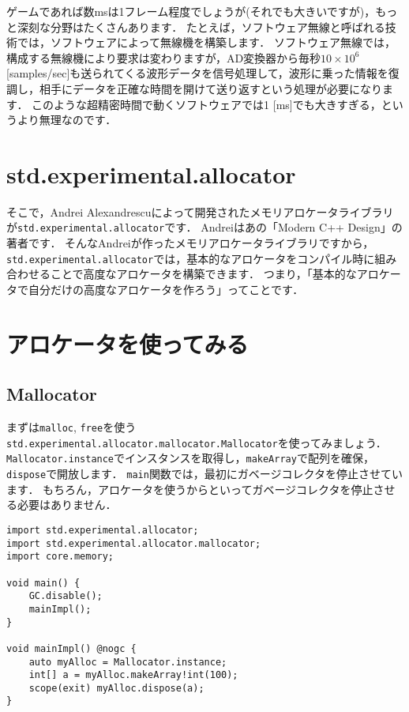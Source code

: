 ゲームであれば数msは1フレーム程度でしょうが(それでも大きいですが)，もっと深刻な分野はたくさんあります．
たとえば，ソフトウェア無線と呼ばれる技術では，ソフトウェアによって無線機を構築します．
ソフトウェア無線では，構成する無線機により要求は変わりますが，AD変換器から毎秒$10 \times 10^6$ [samples/sec]も送られてくる波形データを信号処理して，波形に乗った情報を復調し，相手にデータを正確な時間を開けて送り返すという処理が必要になります．
このような超精密時間で動くソフトウェアでは1
{[}ms{]}でも大きすぎる，というより無理なのです．

\section{std.experimental.allocator}

そこで，Andrei Alexandrescuによって開発されたメモリアロケータライブラリが\texttt{std.experimental.allocator}です．
Andreiはあの「Modern C++ Design」の著者です．
そんなAndreiが作ったメモリアロケータライブラリですから，
\texttt{std.experimental.allocator}では，基本的なアロケータをコンパイル時に組み合わせることで高度なアロケータを構築できます．
つまり，「基本的なアロケータで自分だけの高度なアロケータを作ろう」ってことです．

\section{アロケータを使ってみる}

\subsection{Mallocator}

まずは\texttt{malloc},
\texttt{free}を使う\texttt{std.experimental.allocator.mallocator.Mallocator}を使ってみましょう．
\texttt{Mallocator.instance}でインスタンスを取得し，\texttt{makeArray}で配列を確保，\texttt{dispose}で開放します．
\texttt{main}関数では，最初にガベージコレクタを停止させています．
もちろん，アロケータを使うからといってガベージコレクタを停止させる必要はありません．

\begin{lstlisting}[]
import std.experimental.allocator;
import std.experimental.allocator.mallocator;
import core.memory;

void main() {
    GC.disable();
    mainImpl();
}

void mainImpl() @nogc {
    auto myAlloc = Mallocator.instance;
    int[] a = myAlloc.makeArray!int(100);
    scope(exit) myAlloc.dispose(a);
}
\end{lstlisting}

